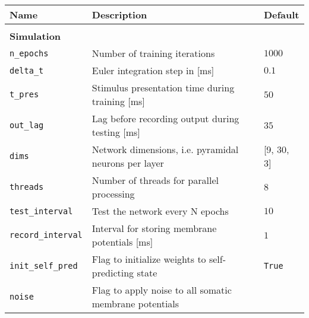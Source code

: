 \begin{table}
  \fontsize{12pt}{12pt}\selectfont
  \begin{center}
    \begin{tabular}{p{}p{}p{}}    \hline
      \textbf{Name}                & \textbf{Description}                                                        &
      \textbf{Default}                                                                                                   \\
      \hline

      \\\textbf{Simulation} \\\hline
      \texttt{n\_epochs}           & Number of training iterations                                               &
      $1000$                                                                                                             \\
      \texttt{delta\_t}            & Euler integration step in [ms]                                              & $0.1$
      \\
      \texttt{t\_pres}             & Stimulus presentation time during training [ms]                             & $50$
      \\
      \texttt{out\_lag}            & Lag before recording output during testing [ms]                             & $35$
      \\
      \texttt{dims}                & Network dimensions, i.e. pyramidal neurons per layer                        & [9,
      30, 3]                                                                                                             \\
      \texttt{threads}             & Number of threads for parallel processing                                   & $8$
      \\
      \texttt{test\_interval}      & Test the network every N epochs                                             & $10$
      \\
      \texttt{record\_interval}    & Interval for storing membrane potentials [ms]                               & $1$
      \\
      \texttt{init\_self\_pred}    & Flag to initialize weights to self-predicting state                         &
      \texttt{True}                                                                                                      \\
      \texttt{noise}               & Flag to apply noise to all somatic membrane potentials

\end{tabular}
\end{center}
\end{table}
